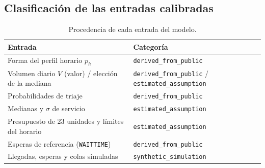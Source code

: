 \subsection{Clasificación de las entradas calibradas}
\begin{table}[ht]
\centering\small
\caption{Procedencia de cada entrada del modelo.}
\label{tab:entradas}
\begin{tabularx}{\linewidth}{@{}X l@{}}
\toprule
Entrada & Categoría \\
\midrule
Forma del perfil horario $p_h$ & \texttt{derived\_from\_public} \\
Volumen diario $V$ (valor) / elección de la mediana & \texttt{derived\_from\_public} / \texttt{estimated\_assumption} \\
Probabilidades de triaje & \texttt{derived\_from\_public} \\
Medianas y $\sigma$ de servicio & \texttt{estimated\_assumption} \\
Presupuesto de 23 unidades y límites del horario & \texttt{estimated\_assumption} \\
Esperas de referencia (\texttt{WAITTIME}) & \texttt{derived\_from\_public} \\
Llegadas, esperas y colas simuladas & \texttt{synthetic\_simulation} \\
\bottomrule
\end{tabularx}
\end{table}
